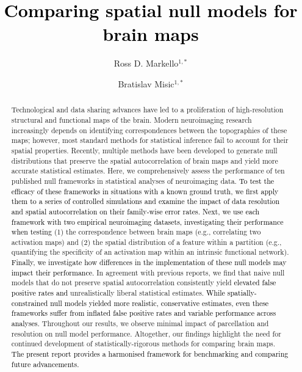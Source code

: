 \documentclass[12pt,aps,pra,reprint,showkeys]{revtex4-1}
\newcommand{\nimg}[1]{\textcolor{black}{{#1}}}
\begin{document}
\title{\nimg{Comparing spatial null models for brain maps}}
\author{Ross D. Markello$^{1,*}$}
\author{Bratislav Misic$^{1,*}$}


\begin{abstract}
\noindent Technological and data sharing advances have led to a proliferation of high-resolution structural and functional maps of the brain.
Modern neuroimaging research increasingly depends on identifying correspondences between the topographies of these maps; however, most standard methods for statistical inference fail to account for their spatial properties.
Recently, multiple methods have been developed to generate null distributions that preserve the spatial autocorrelation of brain maps and yield more accurate statistical estimates.
Here, we comprehensively assess the performance of ten published null frameworks in statistical analyses of neuroimaging data.
\nimg{To test the efficacy of these frameworks in situations with a known ground truth, we first apply them to a series of controlled simulations and examine the impact of data resolution and spatial autocorrelation on their family-wise error rates.
Next, we use each framework with two empirical neuroimaging datasets,  investigating their performance when testing} (1) the correspondence between brain maps (e.g., correlating two activation maps) and (2) the spatial distribution of a feature within a partition (e.g., quantifying the specificity of an activation map within an intrinsic functional network).
\nimg{Finally, we investigate how differences in the implementation of these null models may impact their performance.}
In agreement with previous reports, we find that naive null models that do not preserve spatial autocorrelation consistently yield \nimg{elevated false positive rates and} unrealistically liberal statistical estimates.
\nimg{While spatially-constrained null models yielded more realistic, conservative estimates, even these frameworks suffer from inflated false positive rates and variable performance across analyses.}
Throughout our results, we observe minimal impact of parcellation and resolution on null model performance.
Altogether, our findings highlight the need for continued development of statistically-rigorous methods for comparing brain maps.
\nimg{The present report provides a harmonised framework for benchmarking and comparing future advancements.}

\end{abstract}
\end{document}
